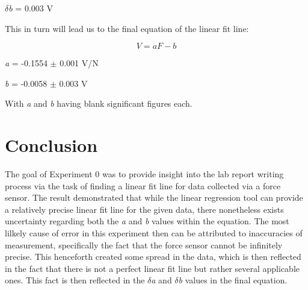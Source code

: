 \documentclass[titlepage]{article}
\begin{document}
\begin{center}
$\delta$\textit{b} = 0.003 V
\end{center}

This in turn will lead us to the final equation of the linear fit line:

\begin{equation}
    \label{eq:line_fit}
     V = aF - b
\end{equation}

\begin{center}
\textit{a} = -0.1554 $\pm$ 0.001 V/N
\end{center}

\begin{center}
\textit{b} = -0.0058 $\pm$ 0.003 V
\end{center}

With \textit{a} and \textit{b} having blank significant figures each.

\section {Conclusion}
The goal of Experiment 0 was to provide insight into the lab report writing process via the task of finding a linear fit line for data collected via a force sensor. The result demonstrated that while the linear regression tool can provide a relatively precise linear fit line for the given data, there nonetheless exists uncertainty regarding both the \textit{a} and \textit{b} values within the equation. The most lilkely cause of error in this experiment then can be attributed to inaccuracies of measurement, specifically the fact that the force sensor cannot be infinitely precise. This henceforth created some spread in the data, which is then reflected in the fact that there is not a perfect linear fit line but rather several applicable ones. This fact is then reflected in the $\delta$\textit{a} and $\delta$\textit{b} values in the final equation.
\end{document}
